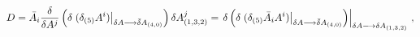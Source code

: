 \begin{equation*}
D=\bar{A}_{i}\frac{\delta }{\delta A^{j}}\left( \delta \left. (\delta
_{(5)}A^{i})\right| _{\delta A\longrightarrow \bar{\delta}A_{(4,0)}}\right)
\delta A_{(1,3,2)}^{j}=\left. \delta \left( \delta \left. (\delta _{(5)}\bar{%
A}_{i}A^{i})\right| _{\delta A\longrightarrow \bar{\delta}A_{(4,0)}}\right)
\right| _{\delta A\longrightarrow \delta A_{(1,3,2)}}\,,
\end{equation*}

